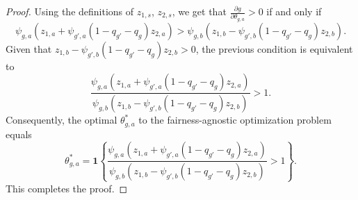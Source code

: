 \documentclass[letterpaper]{article} %
\begin{document}
\begin{proof}
Using the definitions of $z_{1,s}$, $z_{2,s}$, we get that $\frac{\partial g}{\partial \theta_{g,a}}>0$ if and only if
\begin{equation*}
    \psi_{g,a} (z_{1,a} + \psi_{g',a}(1-q_{g'}-q_g) z_{2,a}) >
    \psi_{g,b} (z_{1,b} - \psi_{g',b}(1-q_{g'}-q_g) z_{2,b}).
\end{equation*}
Given that $z_{1,b} - \psi_{g',b}(1-q_{g'}-q_g) z_{2,b}>0$, the previous condition is equivalent to
\begin{equation*}
    \frac{\psi_{g,a} (z_{1,a} + \psi_{g',a}(1-q_{g'}-q_g) z_{2,a})}{\psi_{g,b} (z_{1,b} - \psi_{g',b}(1-q_{g'}-q_g) z_{2,b})} >1.
\end{equation*}
Consequently, the optimal $\theta^*_{g,a}$ to the fairness-agnostic optimization problem equals
\begin{equation*}
    \theta^*_{g,a} = \mathbf{1} \left\{ \frac{\psi_{g,a} (z_{1,a} + \psi_{g',a}(1-q_{g'}-q_g) z_{2,a})}{\psi_{g,b} (z_{1,b} - \psi_{g',b}(1-q_{g'}-q_g) z_{2,b})} >1 \right\}.
\end{equation*}
This completes the proof.
\end{proof}
\end{document}
